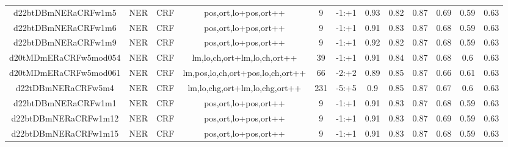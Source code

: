 \documentclass[a4paper]{article}
\begin{document}
\begin{landscape}
\begin{center}
\begin{tabular}{ |c|c|c|c|c|c|c|c|c|c|c|c|}
 	
 
 	
 		
 		\small{ d22btDBmNERaCRFw1m5 } & NER & CRF & pos,ort,lo+pos,ort++  &  9 &  -1:+1  &  0.93 & 0.82 & 0.87  &  0.69 & 0.59 & 0.63 \\
 		

 	
 
 	
 		
 		\small{ d22btDBmNERaCRFw1m6 } & NER & CRF & pos,ort,lo+pos,ort++  &  9 &  -1:+1  &  0.91 & 0.83 & 0.87  &  0.68 & 0.59 & 0.63 \\
 		

 	
 
 	
 		
 		\small{ d22btDBmNERaCRFw1m9 } & NER & CRF & pos,ort,lo+pos,ort++  &  9 &  -1:+1  &  0.92 & 0.82 & 0.87  &  0.68 & 0.59 & 0.63 \\
 		

 	
 
 	
 		
 		\small{ d20tMDmERaCRFw5mod054 } & NER & CRF & lm,lo,ch,ort+lm,lo,ch,ort++  &  39 &  -1:+1  &  0.91 & 0.84 & 0.87  &  0.68 & 0.6 & 0.63 \\
 		

 	
 
 	
 		
 		\small{ d20tMDmERaCRFw5mod061 } & NER & CRF & lm,pos,lo,ch,ort+pos,lo,ch,ort++  &  66 &  -2:+2  &  0.89 & 0.85 & 0.87  &  0.66 & 0.61 & 0.63 \\
 		

 	
 
 	
 		
 		\small{ d22tDBmNERaCRFw5m4 } & NER & CRF & lm,lo,chg,ort+lm,lo,chg,ort++  &  231 &  -5:+5  &  0.9 & 0.85 & 0.87  &  0.67 & 0.6 & 0.63 \\
 		

 	
 
 	
 		
 		\small{ d22btDBmNERaCRFw1m1 } & NER & CRF & pos,ort,lo+pos,ort++  &  9 &  -1:+1  &  0.91 & 0.83 & 0.87  &  0.68 & 0.59 & 0.63 \\
 		

 	
 
 	
 		
 		\small{ d22btDBmNERaCRFw1m12 } & NER & CRF & pos,ort,lo+pos,ort++  &  9 &  -1:+1  &  0.91 & 0.83 & 0.87  &  0.69 & 0.59 & 0.63 \\
 		

 	
 
 	
 		
 		\small{ d22btDBmNERaCRFw1m15 } & NER & CRF & pos,ort,lo+pos,ort++  &  9 &  -1:+1  &  0.91 & 0.83 & 0.87  &  0.68 & 0.59 & 0.63 \\
 		


\end{tabular}
\end{center}
\end{landscape}
\end{document}
